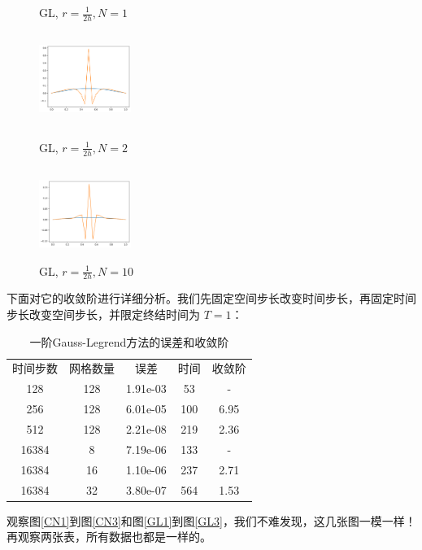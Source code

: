 \documentclass{ctexart}
\begin{document}
\begin{figure}[htbp]
\begin{minipage}{5cm}
		\caption{GL, $r=\frac 1{2h},N=1$}
		\label{GL4}
	\end{minipage}
	\begin{minipage}{5cm}
		\centering
		\includegraphics[width = 3cm, height = 3cm]{2-6-2.png}
		\caption{GL, $r=\frac 1{2h},N=2$}
		\label{GL5}
	\end{minipage}
	\begin{minipage}{5cm}
		\centering
		\includegraphics[width = 3cm, height = 3cm]{2-6-3.png}
		\caption{GL, $r=\frac 1{2h},N=10$}
		\label{GL6}
	\end{minipage}
\end{figure}

下面对它的收敛阶进行详细分析。我们先固定空间步长改变时间步长，再固定时间步长改变空间步长，并限定终结时间为 $T=1$：

\begin{table}\centering
	\begin{tabular}{|c|c|c|c|c|}
	\hline
	时间步数 & 网格数量 & 误差 & 时间 & 收敛阶\\ \cline{1-5}
	128 & 128 & 1.91e-03 & 53  & - \\ \cline{1-5}
	256 & 128 & 6.01e-05 & 100 & 6.95 \\ \cline{1-5}
	512 & 128 & 2.21e-08 & 219 & 2.36\\ \cline{1-5}
	16384 & 8 & 7.19e-06 & 133 & - \\ \cline{1-5}
	16384 & 16 & 1.10e-06 & 237 & 2.71 \\ \cline{1-5}
	16384 & 32 & 3.80e-07 & 564 & 1.53 \\ \cline{1-5}
	\end{tabular}
	\caption{一阶Gauss-Legrend方法的误差和收敛阶}
\end{table}

观察图\ref{CN1}到图\ref{CN3}和图\ref{GL1}到图\ref{GL3}，我们不难发现，这几张图一模一样！再观察两张表，所有数据也都是一样的。
\end{document}
